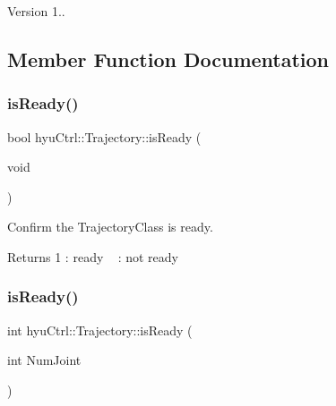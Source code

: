 \begin{DoxyVersion}{Version}
1.. 
\end{DoxyVersion}


\subsection{Member Function Documentation}
\mbox{\label{classhyu_ctrl_1_1_trajectory_ae7ad2c75ec2b482dfb79364e24858f66}} 
\subsubsection{\texorpdfstring{is\+Ready()}{isReady()}\hspace{0.1cm}{\footnotesize\ttfamily [1/2]}}
{\footnotesize\ttfamily bool hyu\+Ctrl\+::\+Trajectory\+::is\+Ready (\begin{DoxyParamCaption}\item[{void}]{ }\end{DoxyParamCaption})\hspace{0.3cm}{\ttfamily [inline]}}



Confirm the Trajectory\+Class is ready. 

\begin{DoxyReturn}{Returns}
1 \+: ready ~ \+: not ready 
\end{DoxyReturn}
\mbox{\label{classhyu_ctrl_1_1_trajectory_a0747f722e56a5c51431d973d6ea585c7}} 
\subsubsection{\texorpdfstring{is\+Ready()}{isReady()}\hspace{0.1cm}{\footnotesize\ttfamily [2/2]}}
{\footnotesize\ttfamily int hyu\+Ctrl\+::\+Trajectory\+::is\+Ready (\begin{DoxyParamCaption}\item[{int}]{Num\+Joint }\end{DoxyParamCaption})\hspace{0.3cm}{\ttfamily [inline]}}



